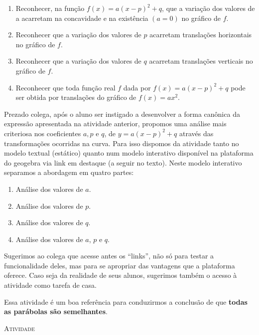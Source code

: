 \documentclass[10 pt,usenames,dvipsnames, oneside]{article}
\begin{document}
\begin{goals}
\begin{enumerate}
\item Reconhecer, na função $f(x)=a(x-p)^2+q$, que a variação dos valores de a acarretam na concavidade e na existência $(a=0)$ no gráfico de $f$.
\item Reconhecer que a variação dos valores de $p$ acarretam translações horizontais no gráfico de $f$.
\item Reconhecer que a variação dos valores de $q$ acarretam translações verticais no gráfico de $f$.
\item Reconhecer que toda função real $f$ dada por $f(x)=a(x−p)^2+q$ pode ser obtida por translações do gráfico de $f(x)=ax^2$.
\end{enumerate}

\tcblower

Prezado colega, após o aluno ser instigado a desenvolver a forma canônica da expressão apresentada na atividade anterior, propomos uma análise mais criteriosa nos coeficientes $a, p$ e $q$, de $y=a(x−p)^2+q$ através das transformações ocorridas na curva. Para isso dispomos da atividade tanto no modelo textual (estático) quanto num modelo interativo disponível na plataforma do geogebra via link em destaque (a seguir no texto). Neste modelo interativo separamos a abordagem em quatro partes:

\begin{enumerate}[label={Parte \arabic*:}]
\item Análise dos valores de $a$.
\item Análise dos valores de $p$.
\item Análise dos valores de $q$.
\item Análise dos valores de $a$, $p$ e $q$.
\end{enumerate}

Sugerimos ao colega que acesse antes os “links”, não só para testar a funcionalidade deles, mas para se apropriar das vantagens que a plataforma oferece. Caso seja da realidade de seus alunos, sugerimos também o acesso à atividade como tarefa de casa.

Essa atividade é um boa referência para conduzirmos a conclusão de que \textbf{todas as parábolas são semelhantes}.
\end{goals}

\medskip
\begin{center}
{\large \scshape Atividade}
\end{center}
\fi
\end{document}
